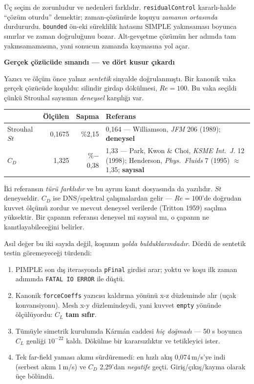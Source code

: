\documentclass[11pt,a4paper]{article}
\newcommand{\kkkenar}{lacivert}
\newcommand{\kkzemin}{kod}
\newenvironment{renkkutu}[3]{%
  \renewcommand{\kkkenar}{#1}\renewcommand{\kkzemin}{#2}%
  \par\medskip\noindent
  \begin{lrbox}{\kutugovde}%
  \begin{minipage}{\dimexpr\linewidth-2\fboxsep-2\fboxrule\relax}\footnotesize
  \textcolor{#1}{\textbf{#3}}\par\vspace{3pt}%
}{%
  \end{minipage}%
  \end{lrbox}%
  \noindent\fcolorbox{\kkkenar}{\kkzemin}{\usebox{\kutugovde}}%
  \par\medskip
}
\newenvironment{olculdu}[1]{\begin{renkkutu}{iyi}{iyibg}{#1}}{\end{renkkutu}}
\begin{document}
\noindent Üç seçim de zorunludur ve nedenleri farklıdır. \texttt{residualControl}
kararlı-halde ``çözüm oturdu'' demektir; zaman-çözünürde koşuyu \emph{zamanın
ortasında} durdururdu. \texttt{bounded} ön-eki süreklilik hatasını SIMPLE
yakınsaması boyunca sınırlar ve zaman doğruluğunu bozar. Alt-gevşetme çözümün
her adımda tam yakınsamamasına, yani sonucun zamanda kaymasına yol açar.

\begin{olculdu}{Gerçek çözücüde sınandı --- ve dört kusur çıkardı}
Yazıcı ve ölçüm önce yalnız \emph{sentetik} sinyalde doğrulanmıştı. Bir kanonik
vaka gerçek çözücüde koşuldu: silindir girdap dökülmesi, $Re=100$. Bu vaka
seçildi çünkü Strouhal sayısının \emph{deneysel} karşılığı var.

\begin{center}\footnotesize
\begin{tabular}{@{}lrrl@{}}
\toprule
& \textbf{Ölçülen} & \textbf{Sapma} & \textbf{Referans} \\
\midrule
Strouhal $St$ & 0{,}1675 & \%2{,}15 & 0{,}164 --- Williamson, \emph{JFM} 206
  (1989); \textbf{deneysel} \\
$C_D$ & 1{,}325 & \%$-$0{,}38 & 1{,}33 --- Park, Kwon \& Choi, \emph{KSME
  Int.\ J.} 12 (1998); Henderson, \emph{Phys.\ Fluids} 7 (1995) $\approx$1{,}35;
  \textbf{sayısal} \\
\bottomrule
\end{tabular}
\end{center}

\noindent İki referansın \emph{türü farklıdır} ve bu ayrım kanıt dosyasında da
yazılıdır. $St$ deneyseldir. $C_D$ ise DNS/spektral çalışmalardan gelir ---
$Re=100$'de doğrudan kuvvet ölçümü zordur ve mevcut deneysel verilerde
(Tritton 1959) saçılma yüksektir. Bir çapanın referansı deneysel mi sayısal mı,
o çapanın ne kanıtlayabileceğini belirler.

\noindent Asıl değer bu iki sayıda değil, koşunun \emph{yolda bulduklarındadır}.
Dördü de sentetik testin göremeyeceği türdendi:

\begin{enumerate}\setlength\itemsep{1pt}
  \item PIMPLE son dış iterasyonda \texttt{pFinal} girdisi arar; yoktu ve koşu
        ilk zaman adımında \texttt{FATAL IO ERROR} ile düştü.
  \item Kanonik \texttt{forceCoeffs} yazıcısı kaldırma yönünü x-z düzleminde
        alır (uçak konvansiyonu). Mesh x-y düzlemindeydi, yani kuvvet
        \texttt{empty} yönünde ölçülüyordu: $C_L$ \textbf{tam sıfır}.
  \item Tümüyle simetrik kurulumda Kármán caddesi \emph{hiç doğmadı} --- 50 s
        boyunca $C_L$ genliği $10^{-22}$ kaldı. Dökülme bir kararsızlıktır ve
        tetikleyici ister.
  \item Tek far-field yaması akımı sürdüremedi: en hızlı akış 0{,}074\,m/s'ye
        indi (serbest akım 1\,m/s) ve $C_D$ 2{,}29'dan \emph{negatife} geçti.
        Giriş/çıkış/kayma olarak üçe bölündü.
\end{enumerate}


\end{olculdu}
\end{document}
